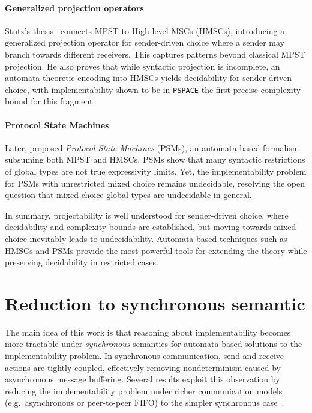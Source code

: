 \paragraph{Generalized projection operators}
Stutz’s thesis~\cite{stutz2024implementability} connects MPST to 
High-level MSCs (HMSCs), introducing a generalized projection operator 
for sender-driven choice where a sender may branch towards different 
receivers. This captures patterns beyond classical MPST projection.  
He also proves that while syntactic projection is incomplete, 
an automata-theoretic encoding into HMSCs yields decidability for 
sender-driven choice, with implementability shown to be in 
\verb|PSPACE|-the first precise complexity bound for this fragment.

\paragraph{Protocol State Machines}
Later, \cite{stutz2025automata} proposed \emph{Protocol State Machines} 
(PSMs), an automata-based formalism subsuming both MPST and HMSCs. 
PSMs show that many syntactic restrictions of global types are not 
true expressivity limits. Yet, the implementability problem for PSMs 
with unrestricted mixed choice remains undecidable, resolving the 
open question that mixed-choice global types are undecidable in general.  

In summary, projectability is well understood for sender-driven choice, 
where decidability and complexity bounds are established, but moving 
towards mixed choice inevitably leads to undecidability. Automata-based 
techniques such as HMSCs and PSMs provide the most powerful tools for 
extending the theory while preserving decidability in restricted cases.

\section{Reduction to synchronous semantic}
The main idea of this work is that reasoning about implementability 
becomes more tractable under \emph{synchronous} 
semantics for automata-based solutions to the implementability problem. 
In synchronous communication, send and receive actions 
are tightly coupled, effectively removing nondeterminism 
caused by asynchronous message buffering. Several results exploit this 
observation by reducing the implementability problem under richer 
communication models (e.g.\ asynchronous or peer-to-peer FIFO) to the 
simpler synchronous case~\cite{alur2005realizability,di2023partial}.

